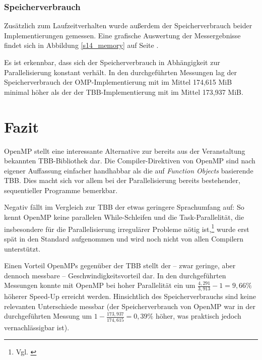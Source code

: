 \documentclass[11pt]{scrartcl}
\begin{document}

\subsubsection{Speicherverbrauch}

Zusätzlich zum Laufzeitverhalten wurde außerdem der Speicherverbrauch beider Implementierungen gemessen. Eine grafische Auswertung der Messergebnisse findet sich in Abbildung \ref{s14_memory} auf Seite \pageref{s14_memory}.

Es ist erkennbar, dass sich der Speicherverbrauch in Abhängigkeit zur Parallelisierung konstant verhält. In den durchgeführten Messungen lag der Speicherverbrauch der OMP-Implementierung mit im Mittel 174,615 MiB minimal höher als der der TBB-Implementier\-ung mit im Mittel 173,937 MiB.

\section{Fazit}

OpenMP stellt eine interessante Alternative zur bereits aus der Veranstaltung bekannten TBB-Bibliothek dar. Die Compiler-Direktiven von OpenMP sind nach eigener Auffassung einfacher handhabbar als die auf \emph{Function Objects} basierende TBB. Dies macht sich vor allem bei der Parallelisierung bereits bestehender, sequentieller Programme bemerkbar.

Negativ fällt im Vergleich zur TBB der etwas geringere Sprachumfang auf: So kennt OpenMP keine parallelen While-Schleifen und die Task-Parallelität, die insbesondere für die Parallelisierung irregulärer Probleme nötig ist,\footnote{Vgl. \cite[S.~6]{duran_tasking_2009}} wurde erst spät in den Standard aufgenommen und wird noch nicht von allen Compilern unterstützt.

Einen Vorteil OpenMPs gegenüber der TBB stellt der -- zwar geringe, aber dennoch messbare -- Geschwindigkeitsvorteil dar. In den durchgeführten Messungen konnte mit OpenMP bei hoher Parallelität ein um $\frac{4,291}{3,913}-1 = 9,66\%$ höherer Speed-Up erreicht werden. Hinsichtlich des Speicherverbrauchs sind keine relevanten Unterschiede messbar (der Speicherverbrauch von OpenMP war in der durchgeführten Messung um $1-\frac{173,937}{174,615} = 0,39\%$ höher, was praktisch jedoch vernachlässigbar ist).
\end{document}
